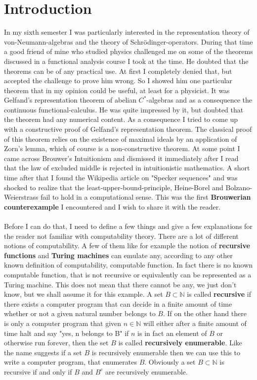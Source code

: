 \documentclass[11pt,a4paper,leqno]{report}
\numberwithin{equation}{chapter}
\begin{document}
\chapter*{Introduction}
In my sixth semester I was particularly interested in the representation theory of von-Neumann-algebras and the theory of Schr\"odinger-operators. During that time a good friend of mine who studied physics challenged me on some of the theorems discussed in a functional analysis course I took at the time. He doubted that the theorems can be of any practical use. At first I completely denied that, but accepted the challenge to prove him wrong. So I showed him one particular theorem that in my opinion could be useful, at least for a physicist. It was Gelfand's representation theorem of abelian $C^*$-algebras and as a consequence the continuous functional-calculus. He was quite impressed by it, but doubted that the theorem had any numerical content. As a consequence I tried to come up with a constructive proof of Gelfand's representation theorem. The classical proof of this theorem relies on the existence of maximal ideals by an application of Zorn's lemma, which of course is a non-constructive theorem. At some point I came across Brouwer's Intuitionism and dismissed it immediately after I read that the law of excluded middle is rejected in intuitionistic mathematics. A short time after that I found the Wikipedia article on "Specker sequences" and was shocked to realize that the least-upper-bound-principle, Heine-Borel and Bolzano-Weierstrass fail to hold in a computational sense. This was the first \textbf{Brouwerian counterexample }I encountered and I wish to share it with the reader.\\
\\
Before I can do that, I need to define a few things and give a few explanations for the reader not familiar with computability theory. There are a lot of different notions of computability. A few of them like for example the notion of \textbf{recursive functions} and \textbf{Turing machines} can emulate any, according to any other known definition of computability, computable function. In fact there is no known computable function, that is not recursive or equivalently can be represented as a Turing machine. This does not mean that there cannot be any, we just don't know, but we shall assume it for this example. A set $B\subset\mathbb{N}$ is called \textbf{recursive} if there exists a computer program that can decide in a finite amount of time whether or not a given natural number belongs to $B$. If on the other hand there is only a computer program that given $n\in\mathbb{N}$ will either after a finite amount of time halt and say "yes, n belongs to B" if $n$ is in fact an element of $B$ or otherwise run forever, then the set $B$ is called \textbf{recursively enumerable}. Like the name suggests if a set $B$ is recursively enumerable then we can use this to write a computer program, that enumerates $B$. Obviously a set $B\subset\mathbb{N}$ is recursive if and only if $B$ and $B^c$ are recursively enumerable.\\ 
\end{document}

